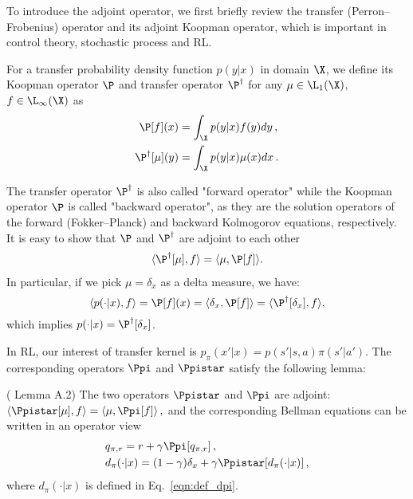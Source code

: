 To introduce the adjoint operator, we first briefly review the transfer (Perron–Frobenius) operator and its adjoint Koopman operator, which is important in control theory, stochastic process and RL. 
\begin{mydef}\label{def:operator}
For a transfer probability density function $p(y|x)$ in domain $\X$, we define its Koopman operator $\P$ and transfer operator $\P^\dag$ for any $\mu \in \L_1(\X)$, $f\in \L_{\infty}(\X)$ as
\begin{align*}
    \P[f](x) &= \int_{\X} p(y|x) f(y) dy\,, \\ 
    \P^\dag[\mu](y) &= \int_{\X} p(y|x) \mu(x) dx\,.
\end{align*}
\end{mydef}
The transfer operator $\P^\dag$ is also called "forward operator" while the Koopman operator $\P$ is called "backward operator", as they are the solution operators of the forward (Fokker–Planck) and backward Kolmogorov equations\citep{lasota2013chaos}, respectively.
It is easy to show that $\P$ and $\P^\dag$ are adjoint to each other
\begin{align*}
\langle \P^\dag[\mu], f\rangle = \langle \mu, \P[f]\rangle.
\end{align*}
In particular, if we pick $\mu = \delta_x$ as a delta measure, we have:
$$
    \langle p(\cdot|x), f\rangle = \P[f](x) = \langle \delta_x, \P[f]\rangle = \langle \P^\dag[\delta_x], f\rangle,
$$
which implies $p(\cdot|x) = \P^\dag[\delta_x]$.

In RL, our interest of transfer kernel is $p_\pi(x'|x) = p(s'|s,a)\pi(s'|a')$.
The corresponding operators $\Ppi$ and $\Ppistar$ satisfy the following lemma:

\begin{lem}
(\citet{tang2019doubly} Lemma A.2) The two operators $\Ppistar$ and $\Ppi$ are adjoint:  
$
    \langle \Ppistar[\mu], f\rangle = \langle \mu, \Ppi[f] \rangle\,,
$
and the corresponding Bellman equations can be written in an operator view
\begin{align}
    & q_{\pi,r} = r + \gamma \Ppi [q_{\pi,r}]\,, \notag\\
    & d_{\pi}(\cdot|x) = (1-\gamma)\delta_x + \gamma \Ppistar [d_{\pi}(\cdot|x)]\,, \label{eqn:bellman_dpi}
\end{align}
where $d_{\pi}(\cdot|x)$ is defined in Eq.~\eqref{eqn:def_dpi}. 
\end{lem}

